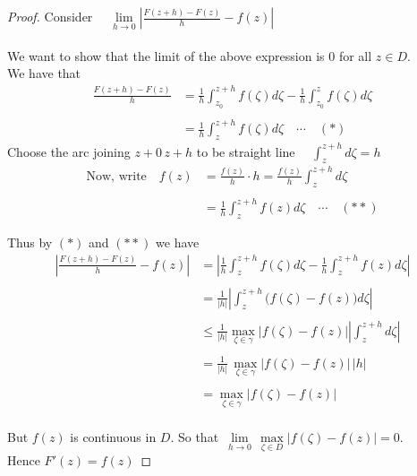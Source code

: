 \documentclass[11pt,a4paper]{article}
\theoremstyle{definition}
\begin{document}
\begin{proof}
Consider $\quad  \displaystyle{\lim\limits_{h \rightarrow 0}\left|\frac{F(z + h) - F(z)}{h} - f(z)\right|}$\\\\ 
We want to show that the limit of the above expression is 0 for all $z \in D$.\\

We have that
\begin{align*}
\frac{F(z + h) - F(z)}{h} & = \frac{1}{h} \int^{z + h}_{z_0} f(\zeta) d\zeta - \frac{1}{h}\int^z_{z_0} f(\zeta)d\zeta\\\\
& = \frac{1}{h}\int^{z + h}_zf(\zeta) d\zeta \quad  \cdots\quad  (*)
\end{align*}
Choose the arc joining $z + 0\, z + h$ to be straight line $\quad  \displaystyle{\int^{z+h}_zd\zeta = h}$\\

\begin{align*}
\text{Now, write}\quad  f(z) & = \frac{f(z)}{h}\cdot h = \frac{f(z)}{h}\int_z^{z + h} d\zeta\\\\
& = \frac{1}{h}\int^{z + h}_z f(z)d\zeta \quad \cdots\quad (**)
\end{align*}


Thus by $(*)$ and $(**)$ we have
\begin{align*}
\left|\frac{F(z + h) - F(z)}{h} - f(z)\right| & = \left|\frac{1}{h}\displaystyle{\int^{z +h}_z f(\zeta) d\zeta - \frac{1}{h}\int^{z + h}_z f(z)d\zeta}\right|\\\\
& = \frac{1}{\left|h\right|
}\left|\displaystyle{\int^{z + h}_z \big( f(\zeta) - f(z)\big) d\zeta}\right|\\\\
& \leq \frac{1}{\left|h\right|} \max\limits_{\zeta \in \gamma}\left|f(\zeta) - f(z)\right|\left|\displaystyle{\int^{z + h}_z d\zeta}\right|\\\\
& = \frac{1}{\left|h\right|}\,\max\limits_{\zeta \in \gamma} \left|f(\zeta) - f(z)\right|\,\left|h\right|\\\\
& = \max\limits_{\zeta\in \gamma}\left|f(\zeta) - f(z)\right|\\
\end{align*}

But $f(z)$ is continuous in $D$. So that $\, \displaystyle{\lim\limits_{h\rightarrow 0} \,\max\limits_{\zeta \in D} \left|f(\zeta) - f(z)\right| = 0}.\quad $\\ Hence $F'(z) = f(z)$
\end{proof}
\end{document}

